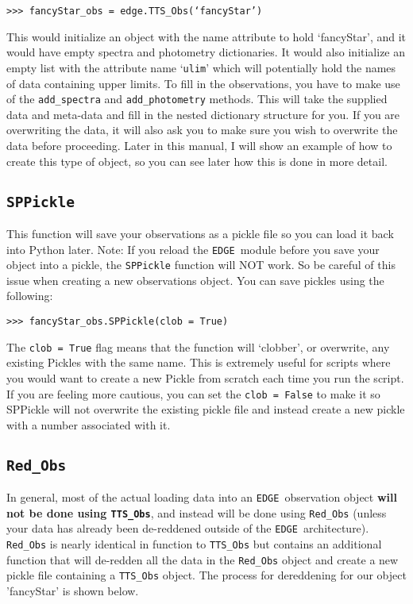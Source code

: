 \documentclass{article}
\newcommand{\edge}{\texttt{EDGE }}
\begin{document}
\vspace{2mm}
\texttt{>>> fancyStar\_obs = edge.TTS\_Obs(‘fancyStar’)}
\vspace{2mm}

This would initialize an object with the name attribute to hold `fancyStar', and it would have empty spectra and photometry dictionaries. It would also initialize an empty list with the attribute name ‘\texttt{ulim}’ which will potentially hold the names of data containing upper limits. 
To fill in the observations, you have to make use of the \texttt{add\_spectra} and \texttt{add\_photometry} methods. This will take the supplied data and meta-data and fill in the nested dictionary structure for you. If you are overwriting the data, it will also ask you to make sure you wish to overwrite the data before proceeding. Later in this manual, I will show an example of how to create this type of object, so you can see later how this is done in more detail. 
 
\subsection{\texttt{SPPickle}}
 
This function will save your observations as a pickle file so you can load it back into Python later. Note: If you reload the \edge module before you save your object into a pickle, the \texttt{SPPickle} function will NOT work. So be careful of this issue when creating a new observations object. You can save pickles using the following:

\vspace{2mm}
\texttt{>>> fancyStar\_obs.SPPickle(clob = True)}
\vspace{2mm}

The \texttt{clob = True} flag means that the function will `clobber', or overwrite, any existing Pickles with the same name. This is extremely useful for scripts where you would want to create a new Pickle from scratch each time you run the script. If you are feeling more cautious, you can set the \texttt{clob = False} to make it so SPPickle will not overwrite the existing pickle file and instead create a new pickle with a number associated with it.

\subsection{\texttt{Red\_Obs}}

In general, most of the actual loading data into an \edge observation object \textbf{will not be done using \texttt{TTS\_Obs}}, and instead will be done using \texttt{Red\_Obs} (unless your data has already been de-reddened outside of the \edge architecture). \texttt{Red\_Obs} is nearly identical in function to \texttt{TTS\_Obs} but contains an additional function that will de-redden all the data in the \texttt{Red\_Obs} object and create a new pickle file containing a \texttt{TTS\_Obs} object.
The process for dereddening for our object 'fancyStar' is shown below.
\end{document}
